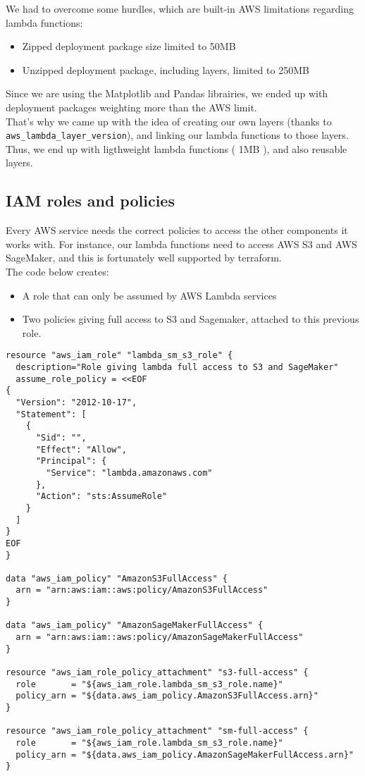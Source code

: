 We had to overcome some hurdles, which are built-in AWS limitations regarding lambda functions: 
\begin{itemize}
    \item Zipped deployment package size limited to 50MB
    \item Unzipped deployment package, including layers, limited to 250MB
\end{itemize}
Since we are using the Matplotlib and Pandas librairies, we ended up with deployment packages weighting more than the AWS limit. \\
That's why we came up with the idea of creating our own layers (thanks to \lstinline{aws_lambda_layer_version}), and linking our lambda functions to those layers. Thus, we end up with ligthweight lambda functions ( \< 1MB ), and also reusable layers.

\subsection{IAM roles and policies}
Every AWS service needs the correct policies to access the other components it works with. For instance, our lambda functions need to access AWS S3 and AWS SageMaker, and this is fortunately well supported by terraform.\\
The code below creates:
\begin{itemize}
    \item A role that can only be assumed by AWS Lambda services
    \item Two policies giving full access to S3 and Sagemaker, attached to this previous role.
\end{itemize}

\begin{lstlisting}
resource "aws_iam_role" "lambda_sm_s3_role" {
  description="Role giving lambda full access to S3 and SageMaker"
  assume_role_policy = <<EOF
{
  "Version": "2012-10-17",
  "Statement": [
    {
      "Sid": "",
      "Effect": "Allow",
      "Principal": {
        "Service": "lambda.amazonaws.com"
      },
      "Action": "sts:AssumeRole"
    }
  ]
}
EOF
}

data "aws_iam_policy" "AmazonS3FullAccess" {
  arn = "arn:aws:iam::aws:policy/AmazonS3FullAccess"
}

data "aws_iam_policy" "AmazonSageMakerFullAccess" {
  arn = "arn:aws:iam::aws:policy/AmazonSageMakerFullAccess"
}

resource "aws_iam_role_policy_attachment" "s3-full-access" {
  role       = "${aws_iam_role.lambda_sm_s3_role.name}"
  policy_arn = "${data.aws_iam_policy.AmazonS3FullAccess.arn}"
}

resource "aws_iam_role_policy_attachment" "sm-full-access" {
  role       = "${aws_iam_role.lambda_sm_s3_role.name}"
  policy_arn = "${data.aws_iam_policy.AmazonSageMakerFullAccess.arn}"
}
\end{lstlisting}

